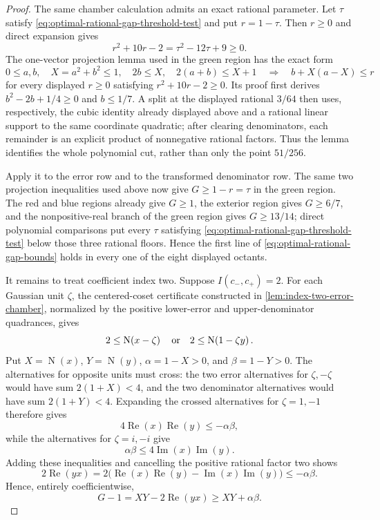 \documentclass[11pt]{article}
\newcommand{\Norm}[1]{\operatorname{N}\!\left(#1\right)}
\newcommand{\Ree}{\operatorname{Re}}
\newcommand{\Imm}{\operatorname{Im}}
\begin{document}
\begin{proof}
The same chamber calculation admits an exact rational parameter.  Let
$\tau$ satisfy
\eqref{eq:optimal-rational-gap-threshold-test} and put $r=1-\tau$.
Then $r\ge0$ and direct expansion gives
\begin{equation}
\label{eq:optimal-projection-polynomial}
 r^2+10r-2=\tau^2-12\tau+9\ge0.
\end{equation}
The one-vector projection lemma used in the green region has the exact form
\[
 0\le a,b,\quad X=a^2+b^2\le1,\quad
 2b\le X,\quad 2(a+b)\le X+1
 \quad\Longrightarrow\quad
 b+X(a-X)\le r
\]
for every displayed $r\ge0$ satisfying
$r^2+10r-2\ge0$.  Its proof first derives
$b^2-2b+1/4\ge0$ and $b\le1/7$.  A split at the displayed rational $3/64$
then uses, respectively, the cubic identity already displayed above and a
rational linear support to the same coordinate quadratic; after clearing
denominators, each remainder is an explicit product of nonnegative rational
factors.  Thus the lemma identifies the whole polynomial cut, rather than
only the point $51/256$.

Apply it to the error row and to the transformed denominator row.  The same
two projection inequalities used above now give $G\ge1-r=\tau$ in the green
region.  The red and blue regions already give $G\ge1$, the exterior region
gives $G\ge6/7$, and the nonpositive-real branch of the green region gives
$G\ge13/14$; direct polynomial comparisons put every $\tau$ satisfying
\eqref{eq:optimal-rational-gap-threshold-test} below those three rational
floors.  Hence the first line of
\eqref{eq:optimal-rational-gap-bounds} holds in every one of the eight
displayed octants.

It remains to treat coefficient index two.
Suppose $I(c_-,c_+)=2$.  For each Gaussian unit $\zeta$, the centered-coset
certificate constructed in \cref{lem:index-two-error-chamber}, normalized by
the positive lower-error and upper-denominator quadrances, gives
\begin{equation}
\label{eq:index-two-unit-obstruction}
 2\le\Norm{x-\zeta}
 \quad\hbox{or}\quad
 2\le\Norm{1-\zeta y}.
\end{equation}
Put $X=\Norm x$, $Y=\Norm y$, $\alpha=1-X>0$, and $\beta=1-Y>0$.
The alternatives for opposite units must cross: the two error alternatives
for $\zeta,-\zeta$ would have sum $2(1+X)<4$, and the two denominator
alternatives would have sum $2(1+Y)<4$.  Expanding the crossed alternatives
for $\zeta=1,-1$ therefore gives
\[
       4\Ree(x)\Ree(y)\le-\alpha\beta,
\]
while the alternatives for $\zeta=i,-i$ give
\[
       \alpha\beta\le4\Imm(x)\Imm(y).
\]
Adding these inequalities and cancelling the positive rational factor two
shows
\[
 2\Ree(yx)=2\bigl(\Ree(x)\Ree(y)-\Imm(x)\Imm(y)\bigr)
   \le-\alpha\beta.
\]
Hence, entirely coefficientwise,
\begin{equation}
\label{eq:index-two-balanced-gap}
 G-1=X Y-2\Ree(yx)\ge X Y+\alpha\beta.
\end{equation}


\end{proof}
\end{document}
